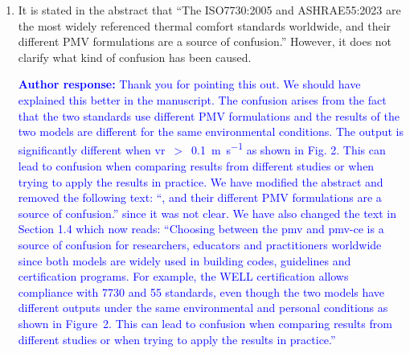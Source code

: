 \documentclass[a4paper, 10pt]{letter}
\newcommand{\response}[1]{\textcolor{blue}{\textbf{Author response:} #1}}
\begin{document}
\begin{letter}
\begin{enumerate}
            \response{This manuscript aims to determine and compare the accuracy of the \ac{pmv} models included in the ISO 7730:2005 and ASHRAE 55:2023 standards.
            We did this by comparing the results of the \ac{pmv} model with the thermal sensation votes collected in the \ac{db2}.
            In addition to comparing the accuracy of the two \ac{pmv} models, we also discussed in the paper that the \ac{pmv} model is inappropriately used by some authors to predict the thermal sensation of individuals outside its range of applicability.
            As a consequence, we recommend limiting the applicability of the \ac{pmv} model to the range specified in Table 2 of the manuscript.
            }

            \item It is stated in the abstract that ``The ISO7730:2005 and ASHRAE55:2023 are the most widely referenced thermal comfort standards worldwide, and their different PMV formulations are a source of confusion.''
            However, it does not clarify what kind of confusion has been caused.

            \response{Thank you for pointing this out.
            We should have explained this better in the manuscript.
            The confusion arises from the fact that the two standards use different PMV formulations and the results of the two models are different for the same environmental conditions.
            The output is significantly different when \ac{vr}~$>$~\qty{0.1}{\m\per\s} as shown in Fig. 2.
            This can lead to confusion when comparing results from different studies or when trying to apply the results in practice.
            We have modified the abstract and removed the following text: ``, and their different PMV formulations are a source of confusion.'' since it was not clear.
            We have also changed the text in Section 1.4 which now reads: ``Choosing between the \ac{pmv} and \ac{pmv-ce} is a source of confusion for researchers, educators and practitioners worldwide since both models are widely used in building codes, guidelines and certification programs.
            For example, the WELL certification allows compliance with \gls{7730} and \gls{55} standards, even though the two models have different outputs under the same environmental and personal conditions as shown in Figure~2. This can lead to confusion when comparing results from different studies or when trying to apply the results in practice.''
            }


\end{enumerate}
\end{letter}
\end{document}
